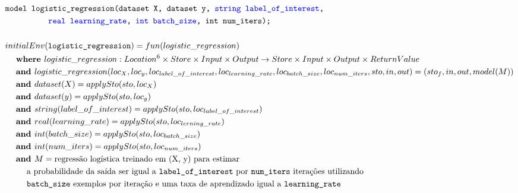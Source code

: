 \documentclass[12pt]{article}
\newcommand{\blu}{\textcolor{blue}}
\begin{document}
\begin{align*}
	&\texttt{model logistic\_regression(dataset X, dataset y, \blu{string label\_of\_interest,}} \\ 
	&\hspace{12ex}\texttt{\blu{real learning\_rate, int batch\_size}, int num\_iters);} \\
	\\
&initialEnv(\texttt{logistic\_regression}) = fun(logistic\_regression) \\
&\hspace{3ex}\textbf{where } logistic\_regression:Location^6\times Store\times Input\times Output\rightarrow Store\times Input\times Output\times ReturnValue \\
&\hspace{3ex}\textbf{and } logistic\_regression(loc_{X}, loc_{y}, loc_{label\_of\_interest}, loc_{learning\_rate}, loc_{batch\_size}, loc_{num\_iters}, sto,in,out) = (sto_f,in,out,model(M))\\
&\hspace{3ex}\textbf{and } dataset(X) = applySto(sto, loc_{X}) \\
&\hspace{3ex}\textbf{and } dataset(y) = applySto(sto, loc_{y}) \\
&\hspace{3ex}\textbf{and } string(label\_of\_interest) = applySto(sto, loc_{label\_of\_interest}) \\
&\hspace{3ex}\textbf{and } real(learning\_rate) = applySto(sto, loc_{lerning\_rate}) \\
&\hspace{3ex}\textbf{and } int(batch\_size) = applySto(sto, loc_{batch\_size}) \\
&\hspace{3ex}\textbf{and } int(num\_iters) = applySto(sto, loc_{num\_iters}) \\
&\hspace{3ex}\textbf{and } M = \text{regressão logística treinado em (X, y) para estimar} \\
&\hspace{6ex}\text{a probabilidade da saída ser igual a \texttt{label\_of\_interest} por \texttt{num\_iters} iterações utilizando} \\
&\hspace{6ex}\text{\texttt{batch\_size} exemplos por iteração e uma taxa de aprendizado igual a \texttt{learning\_rate} }
\end{align*}
\end{document}
